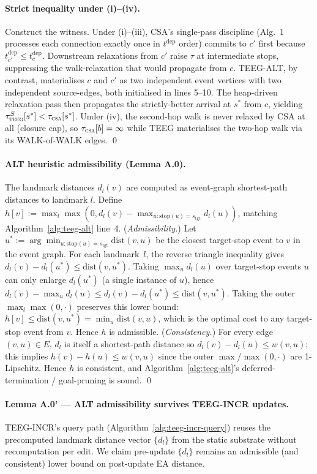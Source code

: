 \documentclass[letterpaper]{article}
\begin{document}
\paragraph{Strict inequality under (i)--(iv).} Construct the witness.
Under (i)--(iii), CSA's single-pass discipline (Alg.~1 processes each
connection exactly once in $t^\text{dep}$ order) commits to
$c'$ first because $t^\text{dep}_{c'} \leq t^\text{dep}_c$. Downstream
relaxations from $c'$ raise $\tau$ at intermediate stops, suppressing
the walk-relaxation that would propagate from $c$. TEEG-ALT, by
contrast, materialises $c$ and $c'$ as two independent event vertices
with two independent source-edges, both initialised in lines 5--10.
The heap-driven relaxation pass then propagates the strictly-better
arrival at $s^*$ from $c$, yielding $\tau^S_\textsc{teeg}[s^*] <
\tau_\textsc{csa}[s^*]$.
Under (iv), the second-hop walk is never relaxed by CSA at all
(closure cap), so $\tau_\textsc{csa}[b] = \infty$ while TEEG materialises
the two-hop walk via its WALK-of-WALK edges. \qed

\paragraph{ALT heuristic admissibility (Lemma A.0).}
The landmark distances $d_l(v)$ are computed as event-graph
shortest-path distances to landmark $l$. Define
$h[v] := \max_l \max(0, d_l(v) - \max_{u : \text{stop}(u) = s_\text{tgt}} d_l(u))$,
matching Algorithm~\ref{alg:teeg-alt} line~4. (\emph{Admissibility.})
Let $u^* := \arg\min_{u : \text{stop}(u) = s_\text{tgt}} \text{dist}(v, u)$
be the closest target-stop event to $v$ in the event graph. For each
landmark~$l$, the reverse triangle inequality gives $d_l(v) - d_l(u^*)
\leq \text{dist}(v, u^*)$. Taking $\max_u d_l(u)$ over target-stop
events $u$ can only enlarge $d_l(u^*)$ (a single instance of $u$),
hence $d_l(v) - \max_u d_l(u) \leq d_l(v) - d_l(u^*) \leq \text{dist}(v, u^*)$.
Taking the outer $\max_l \max(0, \cdot)$ preserves this lower bound:
$h[v] \leq \text{dist}(v, u^*) = \min_u \text{dist}(v, u)$, which is
the optimal cost to any target-stop event from $v$. Hence $h$ is
admissible. (\emph{Consistency.}) For every edge $(v, u) \in E$,
$d_l$ is itself a shortest-path distance so $d_l(v) - d_l(u) \leq w(v, u)$;
this implies $h(v) - h(u) \leq w(v, u)$ since the outer
$\max$/$\max(0, \cdot)$ are 1-Lipschitz. Hence $h$ is consistent, and
Algorithm~\ref{alg:teeg-alt}'s deferred-termination / goal-pruning is
sound. \qed

\paragraph{Lemma A.0' --- ALT admissibility survives TEEG-INCR updates.}
TEEG-INCR's query path (Algorithm~\ref{alg:teeg-incr-query}) reuses
the precomputed landmark distance vector $\{d_l\}$ from the static
substrate without recomputation per edit. We claim pre-update
$\{d_l\}$ remains an admissible (and consistent) lower bound on
post-update EA distance.
\end{document}

